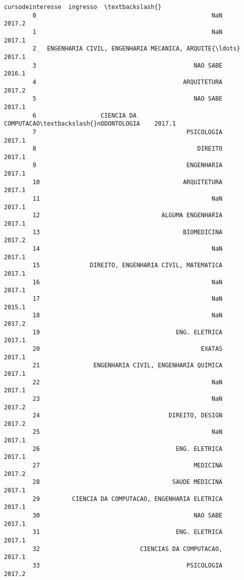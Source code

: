 \documentclass[11pt]{article}
\begin{document}
\begin{Verbatim}[commandchars=\\\{\}]
                                             cursodeinteresse  ingresso  \textbackslash{}
        0                                                 NaN    2017.2   
        1                                                 NaN    2017.1   
        2   ENGENHARIA CIVIL, ENGENHARIA MECANICA, ARQUITE{\ldots}    2017.1   
        3                                            NAO SABE    2016.1   
        4                                         ARQUITETURA    2017.2   
        5                                            NAO SABE    2017.1   
        6                  CIENCIA DA COMPUTACAO\textbackslash{}nODONTOLOGIA    2017.1   
        7                                          PSICOLOGIA    2017.1   
        8                                             DIREITO    2017.1   
        9                                          ENGENHARIA    2017.1   
        10                                        ARQUITETURA    2017.1   
        11                                                NaN    2017.1   
        12                                  ALGUMA ENGENHARIA    2017.1   
        13                                        BIOMEDICINA    2017.2   
        14                                                NaN    2017.1   
        15              DIREITO, ENGENHARIA CIVIL, MATEMATICA    2017.1   
        16                                                NaN    2017.1   
        17                                                NaN    2015.1   
        18                                                NaN    2017.2   
        19                                      ENG. ELETRICA    2017.1   
        20                                             EXATAS    2017.1   
        21               ENGENHARIA CIVIL, ENGENHARIA QUIMICA    2017.1   
        22                                                NaN    2017.1   
        23                                                NaN    2017.2   
        24                                    DIREITO, DESIGN    2017.2   
        25                                                NaN    2017.1   
        26                                      ENG. ELETRICA    2017.1   
        27                                           MEDICINA    2017.2   
        28                                     SAUDE MEDICINA    2017.1   
        29         CIENCIA DA COMPUTACAO, ENGENHARIA ELETRICA    2017.1   
        30                                           NAO SABE    2017.1   
        31                                      ENG. ELETRICA    2017.1   
        32                            CIENCIAS DA COMPUTACAO,    2017.1   
        33                                         PSICOLOGIA    2017.2   

\end{Verbatim}
\end{document}
